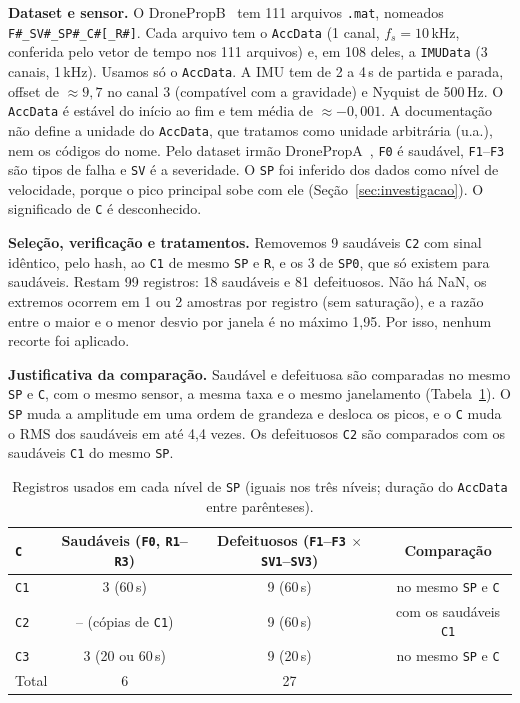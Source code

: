 \documentclass[10pt,a4paper]{article}
\newcommand{\cod}[1]{\texttt{#1}}
\begin{document}
\textbf{Dataset e sensor.} O DronePropB~\cite{dronepropb} tem 111 arquivos \cod{.mat}, nomeados \cod{F\#\_SV\#\_SP\#\_C\#[\_R\#]}.
Cada arquivo tem o \cod{AccData} (1 canal, $f_s = 10$\,kHz, conferida pelo vetor de tempo nos 111 arquivos) e, em 108 deles, a \cod{IMUData} (3 canais, 1\,kHz).
Usamos só o \cod{AccData}.
A IMU tem de 2 a 4\,s de partida e parada, offset de $\approx 9{,}7$ no canal 3 (compatível com a gravidade) e Nyquist de 500\,Hz.
O \cod{AccData} é estável do início ao fim e tem média de $\approx -0{,}001$.
A documentação não define a unidade do \cod{AccData}, que tratamos como unidade arbitrária (u.a.), nem os códigos do nome.
Pelo dataset irmão DronePropA~\cite{dronepropa}, \cod{F0} é saudável, \cod{F1}--\cod{F3} são tipos de falha e \cod{SV} é a severidade.
O \cod{SP} foi inferido dos dados como nível de velocidade, porque o pico principal sobe com ele (Seção~\ref{sec:investigacao}).
O significado de \cod{C} é desconhecido.

\textbf{Seleção, verificação e tratamentos.} Removemos 9 saudáveis \cod{C2} com sinal idêntico, pelo hash, ao \cod{C1} de mesmo \cod{SP} e \cod{R}, e os 3 de \cod{SP0}, que só existem para saudáveis.
Restam 99 registros: 18 saudáveis e 81 defeituosos.
Não há NaN, os extremos ocorrem em 1 ou 2 amostras por registro (sem saturação), e a razão entre o maior e o menor desvio por janela é no máximo 1,95.
Por isso, nenhum recorte foi aplicado.

\textbf{Justificativa da comparação.} Saudável e defeituosa são comparadas no mesmo \cod{SP} e \cod{C}, com o mesmo sensor, a mesma taxa e o mesmo janelamento (Tabela~\ref{tab:registros}).
O \cod{SP} muda a amplitude em uma ordem de grandeza e desloca os picos, e o \cod{C} muda o RMS dos saudáveis em até 4,4 vezes.
Os defeituosos \cod{C2} são comparados com os saudáveis \cod{C1} do mesmo \cod{SP}.

\begin{table}[H]
  \centering\small
  \caption{Registros usados em cada nível de \cod{SP} (iguais nos três níveis; duração do \cod{AccData} entre parênteses).}
  \label{tab:registros}
  \begin{tabular}{lccc}
    \toprule
    \cod{C} & Saudáveis (\cod{F0}, \cod{R1}--\cod{R3}) & Defeituosos (\cod{F1}--\cod{F3} $\times$ \cod{SV1}--\cod{SV3}) & Comparação \\
    \midrule
    \cod{C1} & 3 (60\,s) & 9 (60\,s) & no mesmo \cod{SP} e \cod{C} \\
    \cod{C2} & -- (cópias de \cod{C1}) & 9 (60\,s) & com os saudáveis \cod{C1} \\
    \cod{C3} & 3 (20 ou 60\,s) & 9 (20\,s) & no mesmo \cod{SP} e \cod{C} \\
    \midrule
    Total & 6 & 27 & \\
    \bottomrule
  \end{tabular}
\end{table}
\end{document}

